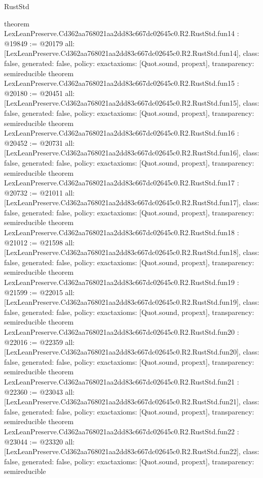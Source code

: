 \begin{lexlean}{RustStd}
\begin{coremodule}
{}
theorem LexLeanPreserve.Cd362aa768021aa2dd83c667dc02645c0.R2.RustStd.fun14 : @19849 := @20179 {
  all: [LexLeanPreserve.Cd362aa768021aa2dd83c667dc02645c0.R2.RustStd.fun14],
  class: false,
  generated: false,
  policy: exact{axioms: [Quot.sound, propext]},
  transparency: semireducible
}
theorem LexLeanPreserve.Cd362aa768021aa2dd83c667dc02645c0.R2.RustStd.fun15 : @20180 := @20451 {
  all: [LexLeanPreserve.Cd362aa768021aa2dd83c667dc02645c0.R2.RustStd.fun15],
  class: false,
  generated: false,
  policy: exact{axioms: [Quot.sound, propext]},
  transparency: semireducible
}
theorem LexLeanPreserve.Cd362aa768021aa2dd83c667dc02645c0.R2.RustStd.fun16 : @20452 := @20731 {
  all: [LexLeanPreserve.Cd362aa768021aa2dd83c667dc02645c0.R2.RustStd.fun16],
  class: false,
  generated: false,
  policy: exact{axioms: [Quot.sound, propext]},
  transparency: semireducible
}
theorem LexLeanPreserve.Cd362aa768021aa2dd83c667dc02645c0.R2.RustStd.fun17 : @20732 := @21011 {
  all: [LexLeanPreserve.Cd362aa768021aa2dd83c667dc02645c0.R2.RustStd.fun17],
  class: false,
  generated: false,
  policy: exact{axioms: [Quot.sound, propext]},
  transparency: semireducible
}
theorem LexLeanPreserve.Cd362aa768021aa2dd83c667dc02645c0.R2.RustStd.fun18 : @21012 := @21598 {
  all: [LexLeanPreserve.Cd362aa768021aa2dd83c667dc02645c0.R2.RustStd.fun18],
  class: false,
  generated: false,
  policy: exact{axioms: [Quot.sound, propext]},
  transparency: semireducible
}
theorem LexLeanPreserve.Cd362aa768021aa2dd83c667dc02645c0.R2.RustStd.fun19 : @21599 := @22015 {
  all: [LexLeanPreserve.Cd362aa768021aa2dd83c667dc02645c0.R2.RustStd.fun19],
  class: false,
  generated: false,
  policy: exact{axioms: [Quot.sound, propext]},
  transparency: semireducible
}
theorem LexLeanPreserve.Cd362aa768021aa2dd83c667dc02645c0.R2.RustStd.fun20 : @22016 := @22359 {
  all: [LexLeanPreserve.Cd362aa768021aa2dd83c667dc02645c0.R2.RustStd.fun20],
  class: false,
  generated: false,
  policy: exact{axioms: [Quot.sound, propext]},
  transparency: semireducible
}
theorem LexLeanPreserve.Cd362aa768021aa2dd83c667dc02645c0.R2.RustStd.fun21 : @22360 := @23043 {
  all: [LexLeanPreserve.Cd362aa768021aa2dd83c667dc02645c0.R2.RustStd.fun21],
  class: false,
  generated: false,
  policy: exact{axioms: [Quot.sound, propext]},
  transparency: semireducible
}
theorem LexLeanPreserve.Cd362aa768021aa2dd83c667dc02645c0.R2.RustStd.fun22 : @23044 := @23320 {
  all: [LexLeanPreserve.Cd362aa768021aa2dd83c667dc02645c0.R2.RustStd.fun22],
  class: false,
  generated: false,
  policy: exact{axioms: [Quot.sound, propext]},
  transparency: semireducible
}
\end{coremodule}
\end{lexlean}
